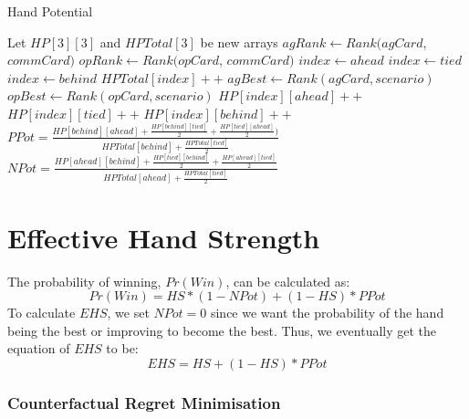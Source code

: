 \documentclass{article}
\begin{document}
  \begin{algorithm}
   \caption{Hand Potential}
    \begin{algorithmic}[1]
        \State Let $HP[3][3]$ and $HPTotal[3]$ be new arrays
        \State $agRank \leftarrow Rank(agCard$, $commCard)$
            \State $opRank \leftarrow Rank(opCard$, $commCard)$
              \State $index \leftarrow ahead$
              \State $index \leftarrow tied$
            \Else
              \State $index \leftarrow behind$
            \EndIf
            \State $HPTotal[index]++$
              \State $agBest \leftarrow Rank(agCard, scenario)$
              \State $opBest \leftarrow Rank(opCard, scenario)$
                \State $HP[index][ahead]++$
                \State $HP[index][tied]++$
              \Else
                \State $HP[index][behind]++$
              \EndIf
            \EndFor
        \EndFor
        \State $PPot=\frac{HP[behind][ahead] + \frac{HP[behind][tied]}{2} +
  \frac{HP[tied][ahead]}{2})}{HPTotal[behind]+\frac{HPTotal[tied]}{2}}$
		\State $NPot = \frac{HP[ahead][behind] + \frac{HP[tied][behind]}{2} + \frac{HP[ahead][tied]}{2}}{HPTotal[ahead]+\frac{HPTotal[tied]}{2}}$
        \State{}
      \EndFunction
    \end{algorithmic}
  \end{algorithm}

\section{Effective Hand Strength}

The probability of winning, $Pr(Win)$, can be calculated as:
\begin{displaymath}
  Pr(Win) = HS * (1-NPot) + (1-HS) * PPot
\end{displaymath}
To calculate $EHS$, we set $NPot=0$ since we want the probability of the hand being the best or improving to become the best. Thus, we eventually get the equation of $EHS$ to be:
\begin{displaymath}
  EHS = HS +(1-HS) * PPot
\end{displaymath}

\subsubsection{Counterfactual Regret Minimisation}
\end{document}
